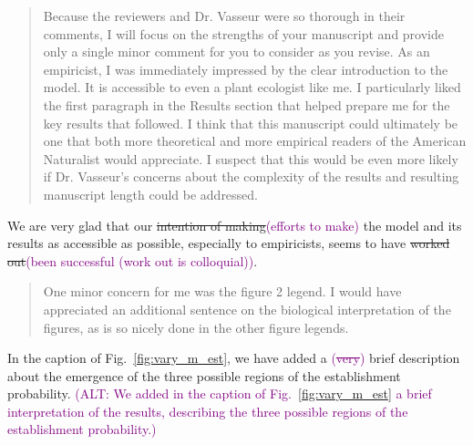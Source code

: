 \documentclass[11pt]{article}
\newenvironment{referee}{\vspace{0.cm} \sffamily \color{colreferee} \begin{quotation} }{\end{quotation} \vspace{0.cm}}
\newcommand{\lmarginpar}[1]{\reversemarginpar\marginpar{\textcolor{colreferee}{\textbf{\textsf{[#1]}}}}}
\newcommand{\addnb}[1]{\refstepcounter{numcom}\lmarginpar{\arabic{numcom}}\label{#1}}
\newcommand{\florence}[1]{\textcolor{purple}{(#1)}}
\newcounter{numcom}
\begin{document}
\begin{referee}
Because \addnb{editor2}the reviewers and Dr. Vasseur were so thorough in their comments, I will focus on the strengths of your manuscript and provide only a single minor comment for you to consider as you revise. As an empiricist, I was immediately impressed by the clear introduction to the model. It is accessible to even a plant ecologist like me. I particularly liked the first paragraph in the Results section that helped prepare me for the key results that followed. I think that this manuscript could ultimately be one that both more theoretical and more empirical readers of the American Naturalist would appreciate. I suspect that this would be even more likely if Dr. Vasseur's concerns about the complexity of the results and resulting manuscript length could be addressed. 
\end{referee}
%
We are very glad that our \st{intention of making}\florence{efforts to make}  the model and its results as accessible as possible, especially to empiricists, seems to have \st{worked out}\florence{been successful (work out is colloquial)}. 

\begin{referee}
One minor concern for me was the figure 2 legend. I would have appreciated an additional sentence on the biological interpretation of the figures, as is so nicely done in the other figure legends. 
\end{referee}
%
In the caption of Fig.~\ref{fig:vary_m_est}, we have added a \florence{\st{very}} brief description about the emergence of the three possible regions of the establishment probability.
\florence{ALT: We added in the caption of Fig.~\ref{fig:vary_m_est} a brief interpretation of the results, describing the three possible regions of the establishment probability.}
\end{document}

